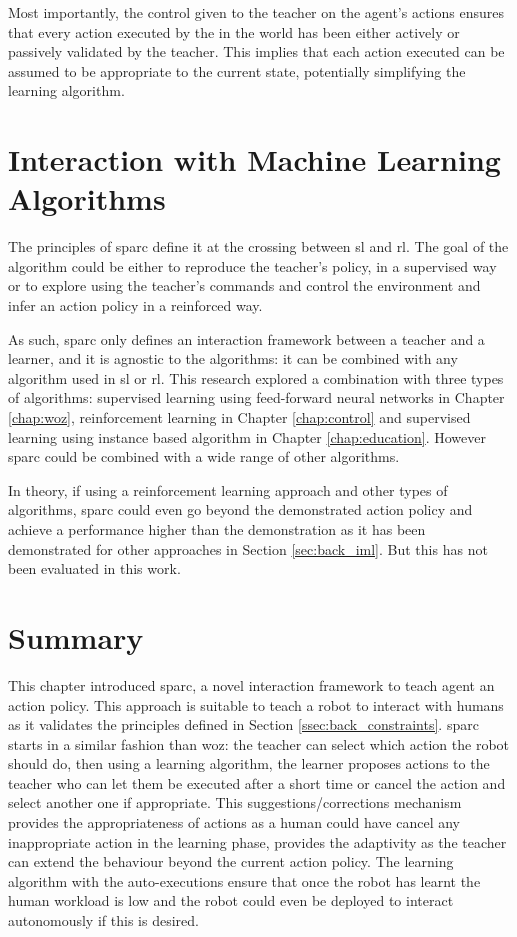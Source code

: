 Most importantly, the control given to the teacher on the agent's actions ensures that every action executed by the in the world has been either actively or passively validated by the teacher. This implies that each action executed can be assumed to be appropriate to the current state, potentially simplifying the learning algorithm.

\section{Interaction with Machine Learning Algorithms}

The principles of \gls{sparc} define it at the crossing between \acrlong{sl} and \acrlong{rl}. The  goal of the algorithm could be either to reproduce the teacher's policy, in a supervised way or to explore using the teacher's commands and control the environment and infer an action policy in a reinforced way.

As such, \gls{sparc} only defines an interaction framework between a teacher and a learner, and it is agnostic to the algorithms: it can be combined with any algorithm used in \acrlong{sl} or \acrlong{rl}. This research explored a combination with three types of algorithms: supervised learning using feed-forward neural networks in Chapter \ref{chap:woz}, reinforcement learning in Chapter \ref{chap:control} and supervised learning using instance based algorithm in Chapter \ref{chap:education}. However \gls{sparc} could be combined with a wide range of other algorithms.

In theory, if using a reinforcement learning approach and other types of algorithms, \gls{sparc} could even go beyond the demonstrated action policy and achieve a performance higher than the demonstration as it has been demonstrated for other approaches in Section \ref{sec:back_iml}. But this has not been evaluated in this work.

\section{Summary}
    
This chapter introduced \acrfull{sparc}, a novel interaction framework to teach agent an action policy. This approach is suitable to teach a robot to interact with humans as it validates the principles defined in Section \ref{ssec:back_constraints}. \gls{sparc} starts in a similar fashion than \gls{woz}: the teacher can select which action the robot should do, then using a learning algorithm, the learner proposes actions to the teacher who can let them be executed after a short time or cancel the action and select another one if appropriate. This suggestions/corrections mechanism provides the appropriateness of actions as a human could have cancel any inappropriate action in the learning phase, provides the adaptivity as the teacher can extend the behaviour beyond the current action policy. The learning algorithm with the auto-executions ensure that once the robot has learnt the human workload is low and the robot could even be deployed to interact autonomously if this is desired.

